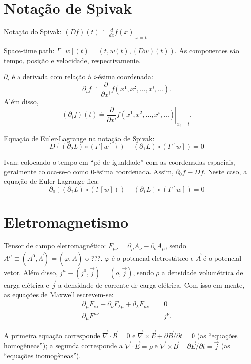\documentclass[a4paper,12pt]{article}
\begin{document}
  \section{Notação de Spivak}
  
  Notação do Spivak: $(Df)(t) \doteq \left.\frac{d}{dx}f(x)\right|_{x=t}$
  
  Space-time path: $\Gamma[w](t) = (t, w(t), (Dw)(t))$. As componentes são tempo, posição e velocidade, respectivamente.
  
  $\partial_i$ é a derivada com relação à $i$-ésima coordenada:
  \begin{equation*}
    \partial_i f \doteq \frac{\partial}{\partial x^i} f(x^1, x^2, \ldots, x^i, \ldots).
  \end{equation*}
  Além disso, 
  \begin{equation*}
    (\partial_i f)(t) \doteq \left.\frac{\partial}{\partial x^i} f(x^1, x^2, \ldots, x^i, \ldots)\right|_{x_i = t}.
  \end{equation*}


  
  Equação de Euler-Lagrange na notação de Spivak: 
  \begin{equation*}
    D\left(\left(\partial_2 L\right) \circ \left(\Gamma[w]\right)\right) - (\partial_1 L) \circ \left(\Gamma[w]\right) = 0
  \end{equation*}
  
  Ivan: colocando o tempo em ``pé de igualdade'' com as coordenadas espaciais, geralmente coloca-se-o como $0$-ésima coordenada.
  Assim, $\partial_0 f \equiv D f$. Neste caso, a equação de Euler-Lagrange fica:
  \begin{equation*}
    \partial_0\left(\left(\partial_2 L\right) \circ \left(\Gamma[w]\right)\right) - (\partial_1 L) \circ \left(\Gamma[w]\right) = 0
  \end{equation*}
  
  \section{Eletromagnetismo}
  
  Tensor de campo eletromagnético: $F_{\mu\nu} = \partial_{\mu}A_{\nu} - \partial_{\nu}A_{\mu}$, sendo $A^{\mu} \equiv (A^0, \vec A) = (\varphi, \vec A)$
  o ???. $\varphi$ é o potencial eletrostático e $\vec A$ é o potencial vetor. Além disso, $j^{\mu} \equiv (j^0, \vec j) = (\rho, \vec j)$, sendo $\rho$
  a densidade volumétrica de carga elétrica e $\vec j$ a densidade de corrente de carga elétrica. Com isso em mente, as equações de Maxwell escrevem-se:
  \begin{align*}
    \partial_{\mu}F_{\nu\lambda} + \partial_{\nu}F_{\lambda\mu} + \partial_{\lambda}F_{\mu\nu} &= 0 \\
    \partial_{\mu}F^{\mu\nu} &= j^{\nu}.    
  \end{align*}
  
  A primeira equação corresponde $\vec\nabla \cdot \vec B = 0$ e $\vec\nabla\times \vec E + \partial\vec B/\partial t = 0$ (as ``equações homogêneas''); a segunda corresponde a
  $\vec\nabla \cdot \vec E = \rho$ e $\vec\nabla\times\vec B - \partial \vec E/\partial t = \vec j$ (as ``equações inomogêneas'').
\end{document}
